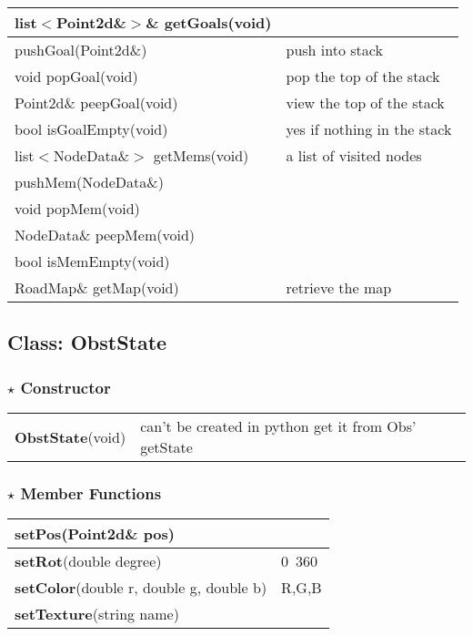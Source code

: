 \documentclass[onecolumn,10pt]{article}
\begin{document}
\begin{tabular}{l|l}
list$<$Point2d\&$>$\& getGoals(void) & \\\hline
pushGoal(Point2d\&)              & push into stack\\\hline
void popGoal(void)                   & pop the top of the stack \\\hline
Point2d\& peepGoal(void)             & view the top of the stack \\\hline
bool isGoalEmpty(void)               & yes if nothing in the stack \\\hline
list$<$NodeData\&$>$ getMems(void)  & a list of visited nodes \\\hline
pushMem(NodeData\&) & \\\hline
void popMem(void)       & \\\hline
NodeData\& peepMem(void)& \\\hline
bool isMemEmpty(void)   & \\\hline
RoadMap\& getMap(void)  & retrieve the map 
\end{tabular}

\subsection{Class: ObstState}
\subsubsection*{$\star$ Constructor}
\begin{tabular}{l|l}
{\bf ObstState}(void) & can't be created in python get it from Obs' getState
\end{tabular}

\subsubsection*{$\star$ Member Functions}

\begin{tabular}{l|l}
{\bf setPos}(Point2d\& pos)                 &       \\\hline
{\bf setRot}(double degree)                 & 0~360 \\\hline
{\bf setColor}(double r, double g, double b)& R,G,B \\\hline
{\bf setTexture}(string name) & 
\end{tabular}

\end{document}
